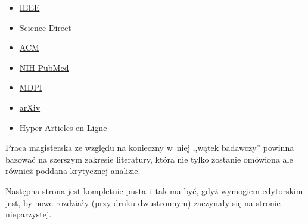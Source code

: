 \begin{itemize}
	\item \href{http://eczyt.bg.pw.edu.pl/han/ieee-import/}{IEEE}
	\item \href{http://eczyt.bg.pw.edu.pl/han/ScienceDirectOnLine}{Science Direct}
	\item \href{http://eczyt.bg.pw.edu.pl/han/ACMDigitalLibrary}{ACM}
	\item \href{https://pubmed.ncbi.nlm.nih.gov/}{NIH PubMed}
	\item \href{https://www.mdpi.com/}{MDPI}
	\item \href{https://arxiv.org/}{arXiv}
	\item \href{https://hal.science/}{Hyper Articles en Ligne}
\end{itemize}


Praca magisterska ze względu na konieczny w~niej ,,wątek badawczy'' powinna bazować na szerszym zakresie literatury, która nie tylko zostanie omówiona ale również poddana krytycznej analizie.

Następna strona jest kompletnie pusta i~tak ma być, gdyż wymogiem edytorskim jest, by nowe rozdziały (przy druku dwustronnym) zaczynały się na stronie nieparzystej.

